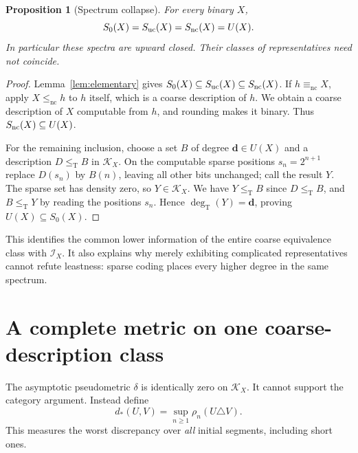 \documentclass[11pt,a4paper]{article}
\newcommand{\leT}{\leq_{\mathrm T}}
\newcommand{\lenc}{\leq_{\mathrm{nc}}}
\newcommand{\eqnc}{\equiv_{\mathrm{nc}}}
\newcommand{\degT}{\operatorname{deg}_{\mathrm T}}
\newcommand{\Core}{\mathcal I}
\newcommand{\dst}{d_{\!*}}
\newtheorem{proposition}[theorem]{Proposition}
\theoremstyle{definition}\newtheorem{definition}[theorem]{Definition}
\theoremstyle{remark}\newtheorem{remark}[theorem]{Remark}
\begin{document}
\begin{proposition}[Spectrum collapse]\label{prop:spectra}
For every binary $X$,
\begin{equation}
              S_0(X)=S_{\rm uc}(X)=S_{\rm nc}(X)=U(X).
              \label{eq:spectra}
\end{equation}
In particular these spectra are upward closed. Their classes of representatives need not coincide.
\end{proposition}
\begin{proof}
Lemma~\ref{lem:elementary} gives $S_0(X)\subseteq S_{\rm uc}(X)\subseteq S_{\rm nc}(X)$. If $h\eqnc X$, apply $X\lenc h$ to $h$ itself, which is a coarse description of $h$. We obtain a coarse description of $X$ computable from $h$, and rounding makes it binary. Thus $S_{\rm nc}(X)\subseteq U(X)$.

For the remaining inclusion, choose a set $B$ of degree $\mathbf d\in U(X)$ and a description $D\leT B$ in $\mathcal K_X$. On the computable sparse positions $s_n=2^{n+1}$ replace $D(s_n)$ by $B(n)$, leaving all other bits unchanged; call the result $Y$. The sparse set has density zero, so $Y\in\mathcal K_X$. We have $Y\leT B$ since $D\leT B$, and $B\leT Y$ by reading the positions $s_n$. Hence $\degT(Y)=\mathbf d$, proving $U(X)\subseteq S_0(X)$.
\end{proof}

This identifies the common lower information of the entire coarse equivalence class with $\Core_X$. It also explains why merely exhibiting complicated representatives cannot refute leastness: sparse coding places every higher degree in the same spectrum.

\section{A complete metric on one coarse-description class}
\label{sec:metric}
The asymptotic pseudometric $\delta$ is identically zero on $\mathcal K_X$. It cannot support the category argument. Instead define
\begin{equation}
       \dst(U,V)=\sup_{n\ge1}\rho_n(U\triangle V).
       \label{eq:prefixmetric}
\end{equation}
This measures the worst discrepancy over \emph{all} initial segments, including short ones.
\end{document}
